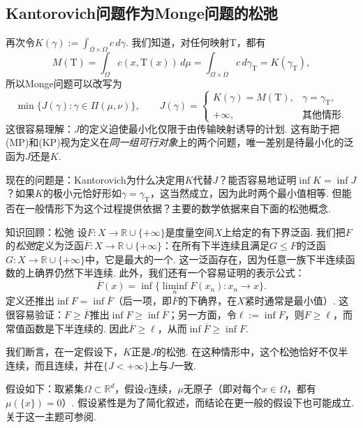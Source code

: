 \subsection{Kantorovich问题作为Monge问题的松弛}\label{sec:1.5}

再次令$K(\gamma):=\int_{\Omega\times\Omega}c\,d\gamma$. 我们知道，对任何映射$\mathrm{T}$，都有
\[
M(\mathrm{T})=\int_\Omega c(x,\mathrm{T}(x))\,d\mu
=\int_{\Omega\times\Omega}c\,d\gamma_\mathrm{T}=K(\gamma_\mathrm{T}),
\]
所以Monge问题可以改写为
\[
\min\{J(\gamma):\gamma\in\Pi(\mu,\nu)\},
\qquad
J(\gamma)=\begin{cases}
K(\gamma)=M(\mathrm{T}),&\gamma=\gamma_\mathrm{T},\\
+\infty,&\text{其他情形}.
\end{cases}
\]
这很容易理解：$J$的定义迫使最小化仅限于由传输映射诱导的计划. 这有助于把(MP)和(KP)视为定义在\emph{同一组可行对象}上的两个问题，唯一差别是待最小化的泛函为$J$还是$K$.

现在的问题是：Kantorovich为什么决定用$K$代替$J$？能否容易地证明$\inf K=\inf J$？如果$K$的极小元恰好形如$\gamma=\gamma_\mathrm{T}$，这当然成立，因为此时两个最小值相等. 但能否在一般情形下为这个过程提供依据？主要的数学依据来自下面的松弛概念.

\begin{sourcebox}{知识回顾：松弛}\label{box:1.10}
设$F:X\to\mathbb R\cup\{+\infty\}$是度量空间$X$上给定的有下界泛函. 我们把$F$的\emph{松弛}定义为泛函$\overline F:X\to\mathbb R\cup\{+\infty\}$：在所有下半连续且满足$G\le F$的泛函$G:X\to\mathbb R\cup\{+\infty\}$中，它是最大的一个. 这一泛函存在，因为任意一族下半连续函数的上确界仍然下半连续. 此外，我们还有一个容易证明的表示公式：
\[
\overline F(x)=\inf\{\liminf_n F(x_n):x_n\to x\}.
\]
定义还推出$\inf F=\inf\overline F$（后一项，即$\overline F$的下确界，在$X$紧时通常是最小值）. 这很容易验证：$F\ge\overline F$推出$\inf F\ge\inf\overline F$；另一方面，令$\ell:=\inf F$，则$F\ge\ell$，而常值函数是下半连续的. 因此$\overline F\ge\ell$，从而$\inf\overline F\ge\inf F$.
\end{sourcebox}

我们断言，在一定假设下，$K$正是$J$的松弛. 在这种情形中，这个松弛恰好不仅半连续，而且连续，并在$\{J<+\infty\}$上与$J$一致.

假设如下：取紧集$\Omega\subset\mathbb R^d$，假设$c$连续，$\mu$无原子（即对每个$x\in\Omega$，都有$\mu(\{x\})=0$）. 假设紧性是为了简化叙述，而结论在更一般的假设下也可能成立. 关于这一主题可参阅\cite{b253,b8}.


